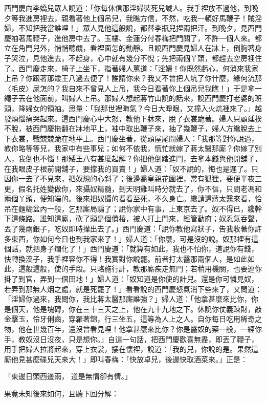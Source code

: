 \begin{showcontents}{}
西門慶向李嬌兒眾人說道：「你每休信那淫婦裝死兒諕人。我手裡放不過他，到晚夕等我進房裡去，親看著他上個吊兒，我瞧方信，不然，吃我一頓好馬鞭子！賊淫婦，不知把我當誰哩！」眾人見他這般說，都替李瓶兒捏兩把汗。到晚夕，見西門慶袖著馬鞭子，進他房中去了。玉樓、金蓮分付春梅把門關了，不許一個人來。都立在角門兒外，悄悄聽覷，看裡面怎的動靜。且說西門慶見婦人在牀上，倒胸著身子哭泣，見他進去，不起身，心中就有幾分不悅；先把兩個丫頭，都趕去空房裡住了。西門慶走來，椅子上坐下，指著婦人罵道：「淫婦！你既然虧心，何消來我家上吊？你跟著那矮王八過去便了！誰請你來？我又不曾把人坑了你什麼，緣何流那〈毛皮〉尿怎的？我自來不曾見人上吊，我今日看著你上個吊兒我瞧！」于是拿一繩子丟在他面前，叫婦人上吊。那婦人想起蔣竹山說的話來，說西門慶打老婆的班頭，降婦女的領袖。思量：「我那世裡晦氣？今日大睜眼，又撞入火炕裡來了。」越發煩惱痛哭起來。這西門慶心中大怒，教他下牀來，脫了衣裳跪著。婦人只顧延挨不脫，被西門慶拖翻在牀地平上，袖中取出鞭子來，抽了幾鞭子，婦人方纔脫去上下衣裳，戰兢兢跪在地平上。西門慶坐著，從頭屋尾問婦人：「我那等對你說過，教你略等等兒，我家中有些事兒；如何不依我，慌忙就嫁了蔣太醫那廝？你嫁了別人，我倒也不惱！那矮王八有甚麼起解？你把他倒踏進門，去拿本錢與他開舖子，在我眼皮子根前開舖子，要撑我的買賣！」婦人道：「奴不說的，悔也是遲了。只因你一去了不見來，把奴想的心斜了；後邊喬皇親花園裡，常有狐狸，要便半夜三更，假名托姓變做你，來攝奴精髓，到天明雞叫時分就去了，你不信，只問老馮和兩個丫頭，便知端的。後來把奴攝的看看至死，不久身亡。纔請這蔣太醫來看，恰吊在麵糊盆內一般，乞那廝局騙了；說你家中有事，上東京去了。奴不得已，纔幹下這條路。誰知這廝，砍了頭是個債樁，被人打上門來，經管動府；奴忍氣吞聲，丟了幾兩銀子，吃奴即時攆出去了。」西門慶道：「說你教他寫狀子，告我收著你許多東西，你如何今日也到我家來了！」婦人道：「你麼，可是沒的說。奴那裡有這個話，就把身子爛化了！」西門慶道：「就算有如此，我也不怕你，道說你有錢，快轉換漢子，我手裡容你不得！我實對你說罷。前者打太醫那兩個人，是如此如此，這般這般，使的手段。只略施行計，教那廝疾走無門；若稍用機關，也要連你掛了到官，弄到一個田地！」婦人道：「奴知道是你使的計兒。還是你可憐見奴，若弄到那無人烟之處，就是死罷了！」看看說的西門慶怒氣消下些來了，又問道：「淫婦你過來，我問你，我比蔣太醫那廝誰強？」婦人道：「他拿甚麼來比你，你是個天，他是塊磚，你在三十三天之上，他在九十九地之下。休說你仗義疎財，敲金擊玉，伶牙俐齒，穿羅著錦，行三坐五，這等為人上之人。自你每日吃用稀奇之物，他在世幾百年，還沒曾看見哩！他拿甚麼來比你？你是醫奴的藥一般，一經你手，教奴沒日沒夜，只是想你。」自這一句話，把西門慶歡喜無盡，即丟了鞭子，用手把婦人拉將起來，穿上衣裳，摟在懷裡，說道：「我的兒，你說的是。果然這廝他見甚麼碟兒天來大！」即叫春梅：「快放卓兒，後邊快取酒菜來。」正是：

「東邊日頭西邊雨，  道是無情卻有情。」

果竟未知後來如何，且聽下回分解：




\end{showcontents}
